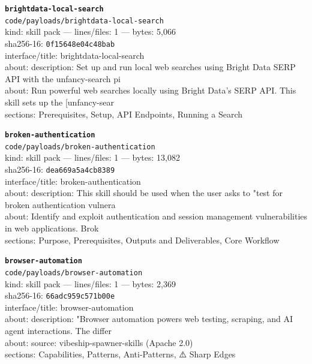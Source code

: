 \noindent\textbf{\texttt{brightdata-local-search}}\\
\texttt{code/payloads/brightdata-local-search}\\
kind: skill pack --- lines/files: 1 --- bytes: 5,066\\
sha256-16: \texttt{0f15648e04c48bab}\\
interface/title: brightdata-local-search\\
about: description: Set up and run local web searches using Bright Data SERP API with the unfancy-search pi\\
about: Run powerful web searches locally using Bright Data's SERP API. This skill sets up the [unfancy-sear\\
sections: Prerequisites, Setup, API Endpoints, Running a Search\\
\vspace*{6.0pt}

\noindent\textbf{\texttt{broken-authentication}}\\
\texttt{code/payloads/broken-authentication}\\
kind: skill pack --- lines/files: 1 --- bytes: 13,082\\
sha256-16: \texttt{dea669a5a4cb8389}\\
interface/title: broken-authentication\\
about: description: This skill should be used when the user asks to "test for broken authentication vulnera\\
about: Identify and exploit authentication and session management vulnerabilities in web applications. Brok\\
sections: Purpose, Prerequisites, Outputs and Deliverables, Core Workflow\\
\vspace*{6.0pt}

\noindent\textbf{\texttt{browser-automation}}\\
\texttt{code/payloads/browser-automation}\\
kind: skill pack --- lines/files: 1 --- bytes: 2,369\\
sha256-16: \texttt{66adc959c571b00e}\\
interface/title: browser-automation\\
about: description: "Browser automation powers web testing, scraping, and AI agent interactions. The differ\\
about: source: vibeship-spawner-skills (Apache 2.0)\\
sections: Capabilities, Patterns, Anti-Patterns, ⚠️ Sharp Edges\\
\vspace*{6.0pt}

